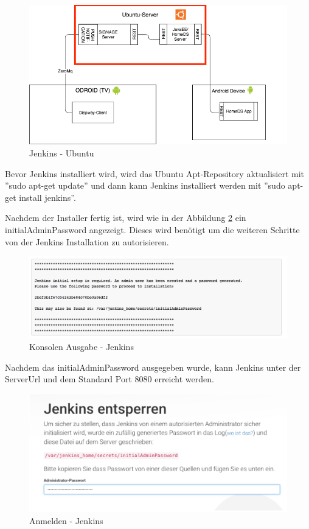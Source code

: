 \begin{figure}[H]
\centering
\includegraphics[width=1\textwidth]{images/09_CI/ci.png}
\caption{Jenkins - Ubuntu}
\label{img:jenkinsubuntu}
\end{figure}

Bevor Jenkins installiert wird, wird das Ubuntu Apt-Repository aktualisiert mit ''sudo apt-get update'' und dann kann Jenkins installiert werden mit ''sudo apt-get install jenkins''.

Nachdem der Installer fertig ist, wird wie in der Abbildung \ref{img:consoleoutput} ein initialAdminPassword angezeigt. Dieses wird benötigt um die weiteren Schritte von der Jenkins Installation zu autorisieren.

\begin{figure}[H]
\centering
\includegraphics[width=1\textwidth]{images/09_CI/consoleOutput.png}
\caption{Konsolen Ausgabe - Jenkins}
\label{img:consoleoutput}
\end{figure}

Nachdem das initialAdminPassword ausgegeben wurde, kann Jenkins unter der ServerUrl  und dem Standard Port 8080 erreicht werden. 

\begin{figure}[H]
\centering
\includegraphics[width=1\textwidth]{images/09_CI/initial.png}
\caption{Anmelden - Jenkins}
\label{img:login}
\end{figure}

